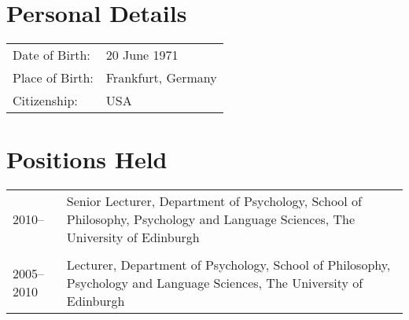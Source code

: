 \documentclass[11pt]{article}
\begin{document}

\noindent{\rule{\textwidth}{1pt}} \\


\section*{Personal Details}
\begin{tabular}{p{3cm}p{12cm}}
Date of Birth: & 20 June 1971 \\
Place of Birth: & Frankfurt, Germany \\
Citizenship: & USA
\end{tabular}

\section*{Positions Held}

\begin{tabular}{p{3cm}p{12cm}}
2010-- & Senior Lecturer, Department of Psychology, School of
Philosophy, Psychology and Language Sciences, The University of
Edinburgh \\ \\

2005--2010 & Lecturer, Department of Psychology, School of
Philosophy, Psychology and Language Sciences, The University of
Edinburgh 
\end{tabular}
\end{document}
